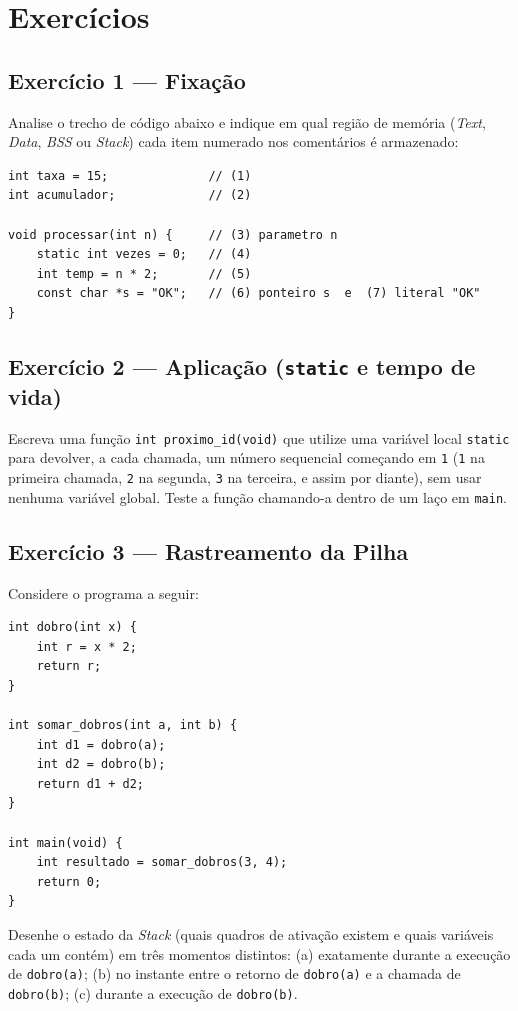 \section*{Exercícios}

\begin{exercicio}

\subsection*{Exercício 1 --- Fixação}
Analise o trecho de código abaixo e indique em qual região de memória (\textit{Text}, \textit{Data}, \textit{BSS} ou \textit{Stack}) cada item numerado nos comentários é armazenado:

\begin{lstlisting}
int taxa = 15;              // (1)
int acumulador;             // (2)

void processar(int n) {     // (3) parametro n
    static int vezes = 0;   // (4)
    int temp = n * 2;       // (5)
    const char *s = "OK";   // (6) ponteiro s  e  (7) literal "OK"
}
\end{lstlisting}

\subsection*{Exercício 2 --- Aplicação (\texttt{static} e tempo de vida)}
Escreva uma função \texttt{int proximo\_id(void)} que utilize uma variável local \texttt{static} para devolver, a cada chamada, um número sequencial começando em \texttt{1} (\texttt{1} na primeira chamada, \texttt{2} na segunda, \texttt{3} na terceira, e assim por diante), sem usar nenhuma variável global. Teste a função chamando-a dentro de um laço em \texttt{main}.

\subsection*{Exercício 3 --- Rastreamento da Pilha}
Considere o programa a seguir:

\begin{lstlisting}
int dobro(int x) {
    int r = x * 2;
    return r;
}

int somar_dobros(int a, int b) {
    int d1 = dobro(a);
    int d2 = dobro(b);
    return d1 + d2;
}

int main(void) {
    int resultado = somar_dobros(3, 4);
    return 0;
}
\end{lstlisting}

Desenhe o estado da \textit{Stack} (quais quadros de ativação existem e quais variáveis cada um contém) em três momentos distintos: (a) exatamente durante a execução de \texttt{dobro(a)}; (b) no instante entre o retorno de \texttt{dobro(a)} e a chamada de \texttt{dobro(b)}; (c) durante a execução de \texttt{dobro(b)}.


\end{exercicio}
